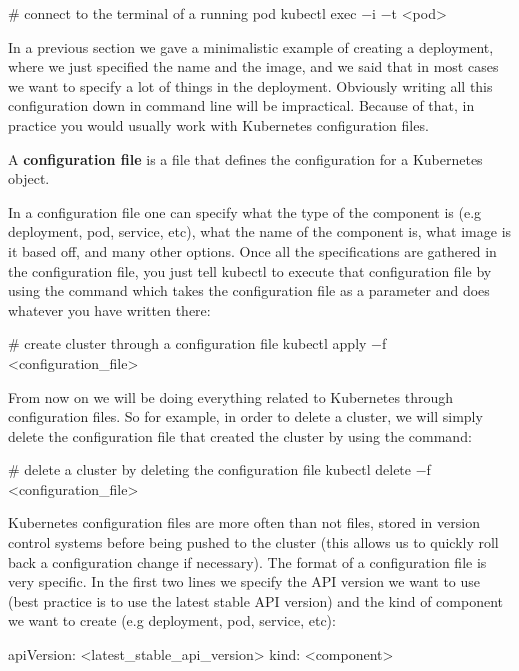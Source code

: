 \begin{bash}
# connect to the terminal of a running pod
kubectl exec $-$i $-$t <pod>
\end{bash}

In a previous section we gave a minimalistic example of creating a deployment, where we just specified the name
and the image, and we said that in most cases we want to specify a lot of things in the deployment. Obviously writing
all this configuration down in command line will be impractical. Because of that, in practice you would usually work
with Kubernetes configuration files.

A \textbf{configuration file} is a file that defines the configuration for a Kubernetes object.
\ed

In a configuration file one can specify what the type of the component is (e.g deployment, pod, service, etc), what
the name of the component is, what image is it based off, and many other options. Once all the specifications are
gathered in the configuration file, you just tell kubectl to execute that configuration file by using the
 command which takes the configuration file as a parameter and does whatever you have written there:

\begin{bash}
# create cluster through a configuration file
kubectl apply $-$f <configuration_file>
\end{bash}

From now on we will be doing everything related to Kubernetes through configuration files. So for example, in order
to delete a cluster, we will simply delete the configuration file that created the cluster by using the command:

\begin{bash}
# delete a cluster by deleting the configuration file
kubectl delete $-$f <configuration_file>
\end{bash}

Kubernetes configuration files are more often than not  files, stored in version control systems before
being pushed to the cluster (this allows us to quickly roll back a configuration change if necessary). The format of
a configuration file is very specific. In the first two lines we specify the API version we want to use (best
practice is to use the latest stable API version) and the kind of component we want to create (e.g deployment, pod,
service, etc):

\begin{block}
apiVersion: <latest_stable_api_version>
kind: <component>
\end{block}

